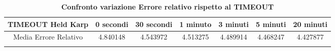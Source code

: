 \begin{longtable}{|c|c|c|c|c|c|c|}
\hline
\textbf{TIMEOUT Held Karp} & \textbf{0 secondi} & \textbf{30 secondi} & \textbf{1 minuto} & \textbf{3 minuti} & \textbf{5 minuti} & \textbf{20 minuti} \\ \hline
Media Errore Relativo            & 4.840148           & 4.543972            & 4.513275          & 4.489914          & 4.468247          & 4.427877           \\ \hline
\caption{\textbf{Confronto variazione Errore relativo rispetto al TIMEOUT}}
\end{longtable}